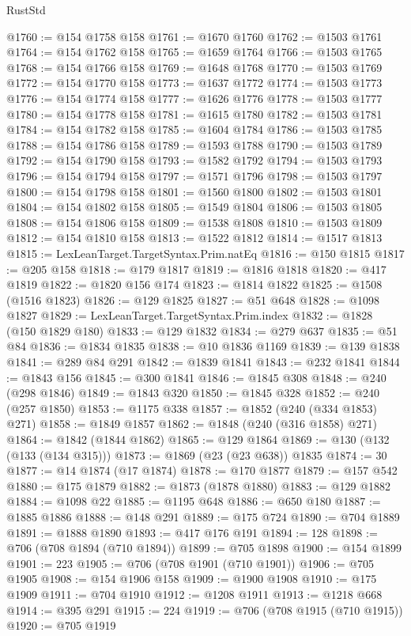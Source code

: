 \begin{lexlean}{RustStd}
\begin{coremodule}
{\begin{coremodule}
{{{{{{{{{{{{{{{{{{{{{{{{{{{{{{{{{{{{{{{@1760 := @154 @1758 @158
@1761 := @1670 @1760
@1762 := @1503 @1761
@1764 := @154 @1762 @158
@1765 := @1659 @1764
@1766 := @1503 @1765
@1768 := @154 @1766 @158
@1769 := @1648 @1768
@1770 := @1503 @1769
@1772 := @154 @1770 @158
@1773 := @1637 @1772
@1774 := @1503 @1773
@1776 := @154 @1774 @158
@1777 := @1626 @1776
@1778 := @1503 @1777
@1780 := @154 @1778 @158
@1781 := @1615 @1780
@1782 := @1503 @1781
@1784 := @154 @1782 @158
@1785 := @1604 @1784
@1786 := @1503 @1785
@1788 := @154 @1786 @158
@1789 := @1593 @1788
@1790 := @1503 @1789
@1792 := @154 @1790 @158
@1793 := @1582 @1792
@1794 := @1503 @1793
@1796 := @154 @1794 @158
@1797 := @1571 @1796
@1798 := @1503 @1797
@1800 := @154 @1798 @158
@1801 := @1560 @1800
@1802 := @1503 @1801
@1804 := @154 @1802 @158
@1805 := @1549 @1804
@1806 := @1503 @1805
@1808 := @154 @1806 @158
@1809 := @1538 @1808
@1810 := @1503 @1809
@1812 := @154 @1810 @158
@1813 := @1522 @1812
@1814 := @1517 @1813
@1815 := LexLeanTarget.TargetSyntax.Prim.natEq
@1816 := @150 @1815
@1817 := @205 @158
@1818 := @179 @1817
@1819 := @1816 @1818
@1820 := @417 @1819
@1822 := @1820 @156 @174
@1823 := @1814 @1822
@1825 := @1508 (@1516 @1823)
@1826 := @129 @1825
@1827 := @51 @648
@1828 := @1098 @1827
@1829 := LexLeanTarget.TargetSyntax.Prim.index
@1832 := @1828 (@150 @1829 @180)
@1833 := @129 @1832
@1834 := @279 @637
@1835 := @51 @84
@1836 := @1834 @1835
@1838 := @10 @1836 @1169
@1839 := @139 @1838
@1841 := @289 @84 @291
@1842 := @1839 @1841
@1843 := @232 @1841
@1844 := @1843 @156
@1845 := @300 @1841
@1846 := @1845 @308
@1848 := @240 (@298 @1846)
@1849 := @1843 @320
@1850 := @1845 @328
@1852 := @240 (@257 @1850)
@1853 := @1175 @338
@1857 := @1852 (@240 (@334 @1853) @271)
@1858 := @1849 @1857
@1862 := @1848 (@240 (@316 @1858) @271)
@1864 := @1842 (@1844 @1862)
@1865 := @129 @1864
@1869 := @130 (@132 (@133 (@134 @315)))
@1873 := @1869 (@23 (@23 @638)) @1835
@1874 := 30
@1877 := @14 @1874 (@17 @1874)
@1878 := @170 @1877
@1879 := @157 @542
@1880 := @175 @1879
@1882 := @1873 (@1878 @1880)
@1883 := @129 @1882
@1884 := @1098 @22
@1885 := @1195 @648
@1886 := @650 @180
@1887 := @1885 @1886
@1888 := @148 @291
@1889 := @175 @724
@1890 := @704 @1889
@1891 := @1888 @1890
@1893 := @417 @176 @191
@1894 := 128
@1898 := @706 (@708 @1894 (@710 @1894))
@1899 := @705 @1898
@1900 := @154 @1899
@1901 := 223
@1905 := @706 (@708 @1901 (@710 @1901))
@1906 := @705 @1905
@1908 := @154 @1906 @158
@1909 := @1900 @1908
@1910 := @175 @1909
@1911 := @704 @1910
@1912 := @1208 @1911
@1913 := @1218 @668
@1914 := @395 @291
@1915 := 224
@1919 := @706 (@708 @1915 (@710 @1915))
@1920 := @705 @1919
}}}}}}}}}}}}}}}}}}}}}}}}}}}}}}}}}}}}}}}
\end{coremodule}}
\end{coremodule}
\end{lexlean}
